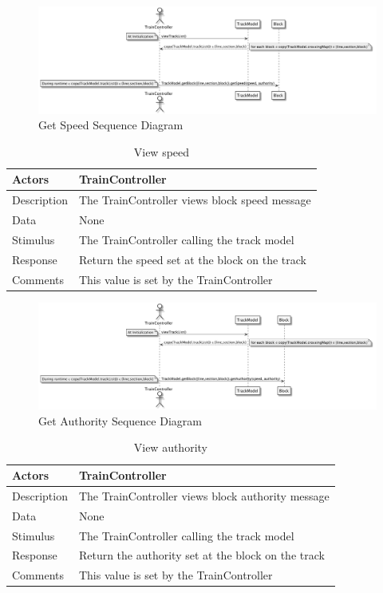 \documentclass[]{article}
\begin{document}
\begin{figure}[H]
	\centering
	\includegraphics[width=\textwidth]{getSpeed.png}
	\caption{Get Speed Sequence Diagram}
\end{figure}

\begin{table}[H]
	\centering
	\caption{View speed}
	\begin{tabular}{|l|l|}
		\hline
		Actors & \parbox[t]{10cm}{TrainController} \\ \hline
		Description & \parbox[t]{10cm}{The TrainController views block speed message} \\ \hline
		Data &  \parbox[t]{10cm}{None} \\ \hline
		Stimulus &  \parbox[t]{10cm}{The TrainController calling the track model} \\ \hline
		Response & \parbox[t]{10cm}{Return the speed set at the block on the track}\\ \hline
		Comments & \parbox[t]{10cm}{This value is set by the TrainController}  \\ \hline
	\end{tabular}
\end{table}

\begin{figure}[H]
	\centering
	\includegraphics[width=\textwidth]{getAuthority.png}
	\caption{Get Authority Sequence Diagram}
\end{figure}
\begin{table}[H]
	\centering
	\caption{View authority}
	\begin{tabular}{|l|l|}
		\hline
		Actors & \parbox[t]{10cm}{TrainController} \\ \hline
		Description & \parbox[t]{10cm}{The TrainController views block authority message} \\ \hline
		Data &  \parbox[t]{10cm}{None} \\ \hline
		Stimulus &  \parbox[t]{10cm}{The TrainController calling the track model} \\ \hline
		Response & \parbox[t]{10cm}{Return the authority set at the block on the track}\\ \hline
		Comments & \parbox[t]{10cm}{This value is set by the TrainController}  \\ \hline
	\end{tabular}
\end{table}
\end{document}
